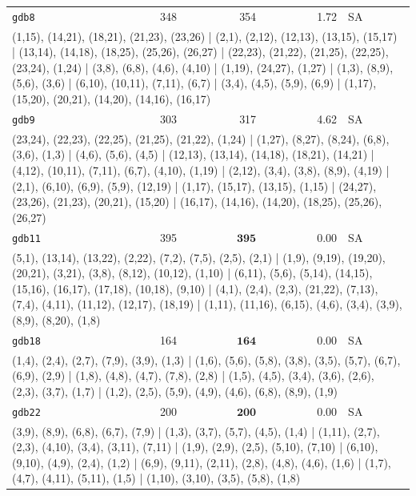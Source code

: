 \begin{longtable}{lrrrl}
\texttt{gdb8} & 348 & 354 & 1.72 & SA \\
\multicolumn{5}{p{0.96\linewidth}}{\tiny\raggedright\arraybackslash (1,15), (14,21), (18,21), (21,23), (23,26) | (2,1), (2,12), (12,13), (13,15), (15,17) | (13,14), (14,18), (18,25), (25,26), (26,27) | (22,23), (21,22), (21,25), (22,25), (23,24), (1,24) | (3,8), (6,8), (4,6), (4,10) | (1,19), (24,27), (1,27) | (1,3), (8,9), (5,6), (3,6) | (6,10), (10,11), (7,11), (6,7) | (3,4), (4,5), (5,9), (6,9) | (1,17), (15,20), (20,21), (14,20), (14,16), (16,17)} \\[2pt]
\texttt{gdb9} & 303 & 317 & 4.62 & SA \\
\multicolumn{5}{p{0.96\linewidth}}{\tiny\raggedright\arraybackslash (23,24), (22,23), (22,25), (21,25), (21,22), (1,24) | (1,27), (8,27), (8,24), (6,8), (3,6), (1,3) | (4,6), (5,6), (4,5) | (12,13), (13,14), (14,18), (18,21), (14,21) | (4,12), (10,11), (7,11), (6,7), (4,10), (1,19) | (2,12), (3,4), (3,8), (8,9), (4,19) | (2,1), (6,10), (6,9), (5,9), (12,19) | (1,17), (15,17), (13,15), (1,15) | (24,27), (23,26), (21,23), (20,21), (15,20) | (16,17), (14,16), (14,20), (18,25), (25,26), (26,27)} \\[2pt]
\texttt{gdb11} & 395 & $\mathbf{395}$ & 0.00 & SA \\
\multicolumn{5}{p{0.96\linewidth}}{\tiny\raggedright\arraybackslash (5,1), (13,14), (13,22), (2,22), (7,2), (7,5), (2,5), (2,1) | (1,9), (9,19), (19,20), (20,21), (3,21), (3,8), (8,12), (10,12), (1,10) | (6,11), (5,6), (5,14), (14,15), (15,16), (16,17), (17,18), (10,18), (9,10) | (4,1), (2,4), (2,3), (21,22), (7,13), (7,4), (4,11), (11,12), (12,17), (18,19) | (1,11), (11,16), (6,15), (4,6), (3,4), (3,9), (8,9), (8,20), (1,8)} \\[2pt]
\texttt{gdb18} & 164 & $\mathbf{164}$ & 0.00 & SA \\
\multicolumn{5}{p{0.96\linewidth}}{\tiny\raggedright\arraybackslash (1,4), (2,4), (2,7), (7,9), (3,9), (1,3) | (1,6), (5,6), (5,8), (3,8), (3,5), (5,7), (6,7), (6,9), (2,9) | (1,8), (4,8), (4,7), (7,8), (2,8) | (1,5), (4,5), (3,4), (3,6), (2,6), (2,3), (3,7), (1,7) | (1,2), (2,5), (5,9), (4,9), (4,6), (6,8), (8,9), (1,9)} \\[2pt]
\texttt{gdb22} & 200 & $\mathbf{200}$ & 0.00 & SA \\
\multicolumn{5}{p{0.96\linewidth}}{\tiny\raggedright\arraybackslash (3,9), (8,9), (6,8), (6,7), (7,9) | (1,3), (3,7), (5,7), (4,5), (1,4) | (1,11), (2,7), (2,3), (4,10), (3,4), (3,11), (7,11) | (1,9), (2,9), (2,5), (5,10), (7,10) | (6,10), (9,10), (4,9), (2,4), (1,2) | (6,9), (9,11), (2,11), (2,8), (4,8), (4,6), (1,6) | (1,7), (4,7), (4,11), (5,11), (1,5) | (1,10), (3,10), (3,5), (5,8), (1,8)} \\[2pt]

\end{longtable}
